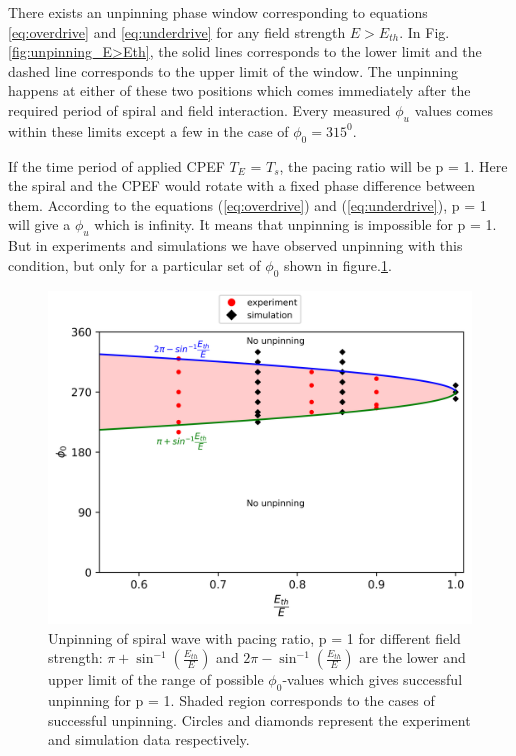 \documentclass[%
 preprint,
 amsmath,amssymb,
 aps,
]{revtex4-2}
\begin{document}
There exists an unpinning phase window corresponding to equations \ref{eq:overdrive} and \ref{eq:underdrive} for any field strength $E>E_{th}$. In Fig.\ref{fig:unpinning_E>Eth}, the solid lines corresponds to the lower limit and the dashed line corresponds to the upper limit of the window. The unpinning happens at either of these two positions which comes immediately after the required period of spiral and field interaction. Every measured $\phi_u$ values comes within these limits except a few in the case of $\phi_{0} = 315^0$. 


If the time period of applied CPEF $T_E$ = $T_s$, the pacing ratio will be p = 1. Here the spiral and the CPEF would rotate with a fixed phase difference between them. According to the equations (\ref{eq:overdrive}) and (\ref{eq:underdrive}), p = 1 will give a $\phi_u$ which is infinity. It means that unpinning is impossible for p = 1. But in experiments and simulations we have observed unpinning with this condition, but only for a particular set of $\phi_0$ shown in figure.\ref{fig:unpinning_p1}. 
\begin{figure}[H]
    \centering
    \includegraphics{p1.png}
    \caption{Unpinning of spiral wave with pacing ratio, p = 1 for different field strength: $\pi+{\sin^{-1}}{(\frac{E_{th}}{E})}$ and $2\pi-{\sin^{-1}}{(\frac{E_{th}}{E})}$ are the lower and upper limit of 
    the range of possible ${\phi}_0$-values which gives successful unpinning for p = 1. Shaded region corresponds to the cases of successful unpinning.
    Circles and diamonds represent the experiment and simulation data respectively.}
    \label{fig:unpinning_p1}
\end{figure}
\end{document}
